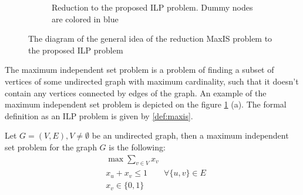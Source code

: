 \begin{figure}[ht]
\begin{subfigure}{.5\textwidth}
        \caption{Reduction to the proposed ILP problem. Dummy nodes are colored in \textcolor{blue!60}{blue}}
    \end{subfigure}
    \caption{The diagram of the general idea of the reduction MaxIS problem to the proposed ILP problem}
    \label{fig:maxis_reduction}
\end{figure}

The maximum independent set problem is a problem of finding a subset of vertices of some undirected
graph with maximum cardinality, such that it doesn't contain any vertices connected by edges of the graph.
An example of the maximum independent set problem is depicted on the figure \ref{fig:maxis_reduction} (a).
The formal definition as an ILP problem is given by \ref{def:maxis}.
\begin{definition}[MaxIS] \label{def:maxis}
    Let \( G=(V, E), V \neq \emptyset \) be an undirected graph, then a maximum independent set problem for the graph \( G \) is the following:
    \begin{align*}
         & \max \sum\limits_{v \in V} x_v                               \\
         & x_u + x_v \leq 1               \qquad \forall \{u, v\} \in E \\
         & x_v \in \{0, 1\}
    \end{align*}
\end{definition}

